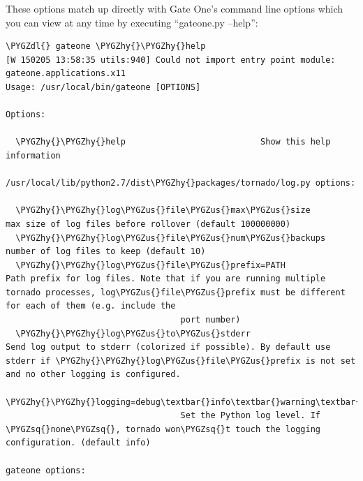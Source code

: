 \documentclass[letterpaper,10pt,openany]{sphinxmanual}
\def\PYGZus{\char`\_}
\def\PYGZdl{\char`\$}
\def\PYGZhy{\char`\-}
\def\PYGZsq{\char`\'}
\begin{document}
These options match up directly with Gate One's command line options which you can view at any time by executing ``gateone.py --help'':

\begin{Verbatim}[commandchars=\\\{\}]
\PYGZdl{} gateone \PYGZhy{}\PYGZhy{}help
[W 150205 13:58:35 utils:940] Could not import entry point module: gateone.applications.x11
Usage: /usr/local/bin/gateone [OPTIONS]

Options:

  \PYGZhy{}\PYGZhy{}help                           Show this help information

/usr/local/lib/python2.7/dist\PYGZhy{}packages/tornado/log.py options:

  \PYGZhy{}\PYGZhy{}log\PYGZus{}file\PYGZus{}max\PYGZus{}size              max size of log files before rollover (default 100000000)
  \PYGZhy{}\PYGZhy{}log\PYGZus{}file\PYGZus{}num\PYGZus{}backups           number of log files to keep (default 10)
  \PYGZhy{}\PYGZhy{}log\PYGZus{}file\PYGZus{}prefix=PATH           Path prefix for log files. Note that if you are running multiple tornado processes, log\PYGZus{}file\PYGZus{}prefix must be different for each of them (e.g. include the
                                   port number)
  \PYGZhy{}\PYGZhy{}log\PYGZus{}to\PYGZus{}stderr                  Send log output to stderr (colorized if possible). By default use stderr if \PYGZhy{}\PYGZhy{}log\PYGZus{}file\PYGZus{}prefix is not set and no other logging is configured.
  \PYGZhy{}\PYGZhy{}logging=debug\textbar{}info\textbar{}warning\textbar{}error\textbar{}none 
                                   Set the Python log level. If \PYGZsq{}none\PYGZsq{}, tornado won\PYGZsq{}t touch the logging configuration. (default info)

gateone options:


\end{Verbatim}
\end{document}
